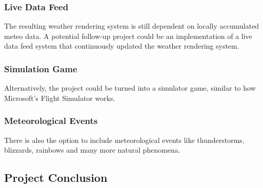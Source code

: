 \subsubsection{Live Data Feed}
The resulting weather rendering system is still dependent on locally accumulated meteo data. 
A potential follow-up project could be an implementation of a live data feed system that continuously updated the weather rendering system.

\subsubsection{Simulation Game}
Alternatively, the project could be turned into a simulator game, similar to how Microsoft's Flight Simulator works.

\subsubsection{Meteorological Events}
There is also the option to include meteorological events like thunderstorms, blizzards, rainbows and many more natural phenomena.

\subsection{Project Conclusion}
\label{section:project:conclusion}
